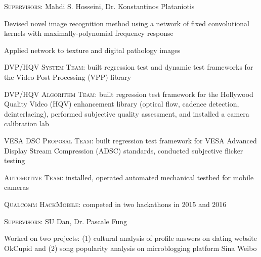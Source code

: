 \documentclass[12pt]{cv_style}
\begin{document}
%
\textsc{Supervisors:} Mahdi S. Hosseini, Dr. Konstantinos Plataniotis
\begin{ditem}
	\item Devised novel image recognition method using a network of fixed convolutional kernels with maximally-polynomial frequency response
	\item Applied network to texture and digital pathology images
\end{ditem}
%
\begin{ditem}
	\item \textsc{DVP/HQV System Team}: built regression test and dynamic test frameworks for the Video Post-Processing (VPP) library
	\item \textsc{DVP/HQV Algorithm Team}: built regression test framework for the Hollywood Quality Video (HQV) enhancement library (optical flow, cadence detection, deinterlacing), performed subjective quality assessment, and installed a camera calibration lab
	\item \textsc{VESA DSC Proposal Team}: built regression test framework for VESA Advanced Display Stream Compression (ADSC) standards, conducted subjective flicker testing
	\item \textsc{Automotive Team}: installed, operated automated mechanical testbed for mobile cameras
	\item \textsc{Qualcomm HackMobile}: competed in two hackathons in 2015 and 2016
\end{ditem}
%
\textsc{Supervisors:} SU Dan, Dr. Pascale Fung
\begin{ditem}
	\item Worked on two projects: (1) cultural analysis of profile answers on dating website OkCupid and (2) song popularity analysis on microblogging platform Sina Weibo
\end{ditem}
%
\end{document}
